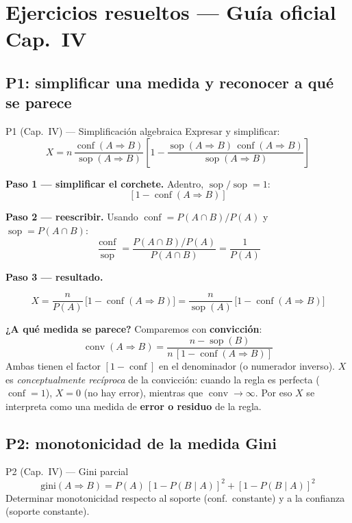\documentclass[11pt,a4paper]{article}
\newcommand{\conf}{\operatorname{conf}}
\newcommand{\sop}{\operatorname{sop}}
\newcommand{\conv}{\operatorname{conv}}
\begin{document}
\section{Ejercicios resueltos — Guía oficial Cap.\ IV}

\subsection{P1: simplificar una medida y reconocer a qué se parece}

\begin{ejerciciobox}{P1 (Cap.\ IV) — Simplificación algebraica}
Expresar y simplificar:
\[
X = n\,\frac{\conf(A \Rightarrow B)}{\sop(A \Rightarrow B)}
    \left[1 - \frac{\sop(A \Rightarrow B)\,\conf(A \Rightarrow B)}{\sop(A \Rightarrow B)}\right]
\]
\end{ejerciciobox}

\textbf{Paso 1 — simplificar el corchete.} Adentro, $\sop/\sop = 1$:
\[
\left[1 - \conf(A \Rightarrow B)\right]
\]

\textbf{Paso 2 — reescribir.} Usando $\conf = P(A \cap B)/P(A)$ y $\sop = P(A \cap B)$:
\[
\frac{\conf}{\sop} = \frac{P(A \cap B)/P(A)}{P(A \cap B)} = \frac{1}{P(A)}
\]

\textbf{Paso 3 — resultado.}
\begin{formulabox}[Resultado P1]
\[
\boxed{\;X = \frac{n}{P(A)}\,\bigl[1 - \conf(A \Rightarrow B)\bigr] = \frac{n}{\sop(A)}\,\bigl[1 - \conf(A \Rightarrow B)\bigr]\;}
\]
\end{formulabox}

\textbf{¿A qué medida se parece?} Comparemos con \textbf{convicción}:
\[
\conv(A \Rightarrow B) = \frac{n - \sop(B)}{n\,[1 - \conf(A \Rightarrow B)]}
\]
Ambas tienen el factor $[1 - \conf]$ en el denominador (o numerador inverso). $X$ es
\emph{conceptualmente recíproca} de la convicción: cuando la regla es perfecta ($\conf = 1$),
$X = 0$ (no hay error), mientras que $\conv \to \infty$. Por eso $X$ se interpreta como
una medida de \textbf{error o residuo} de la regla.

\subsection{P2: monotonicidad de la medida Gini}

\begin{ejerciciobox}{P2 (Cap.\ IV) — Gini parcial}
\[
\text{gini}(A \Rightarrow B) = P(A)\,[1 - P(B \mid A)]^2 + [1 - P(B \mid A)]^2
\]
Determinar monotonicidad respecto al soporte (conf.\ constante) y a la confianza (soporte constante).
\end{ejerciciobox}
\end{document}

